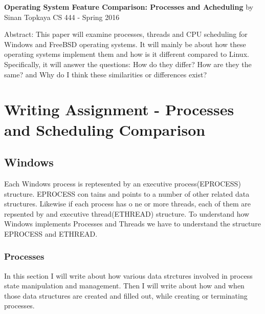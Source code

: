 \documentclass[letterpaper,10pt,draftclsnofoot,onecolumn]{IEEEtran}
\begin{document}
	\begin{titlepage}
		
		\begin{center}
		\bigbreak	
		\textbf{Operating System Feature Comparison: Processes and Acheduling}
		\bigbreak
		by Sinan Topkaya
		\smallbreak
		CS 444 - Spring 2016
		\end{center}
		\vfill
		
		Abstract: This paper will examine processes, threads and CPU scheduling for Windows and FreeBSD operating systems. It will mainly be about how these operating systems implement them and how is it different compared to Linux. Specifically, it will answer the questions: How do they differ? How are they the same? and Why do I think these similarities or differences exist?
		
	\end{titlepage}

\section*{Writing Assignment - Processes and Scheduling Comparison}

\subsection*{Windows}

Each Windows process is reptesented by an executive process(EPROCESS) structure. EPROCESS con
tains and points to a number of other related data structures. Likewise if each process has o
ne or more threads, each of them are repsented by and executive thread(ETHREAD) structure. To understand how Windows implements Processes and Threads we have to understand the structure EPROCESS and ETHREAD. 

\subsubsection*{Processes}

In this section I will write about how various data strctures involved in process state manipulation and management. Then I will write about how and when those data structures are created and filled out, while creating or terminating processes.\\
\end{document}
